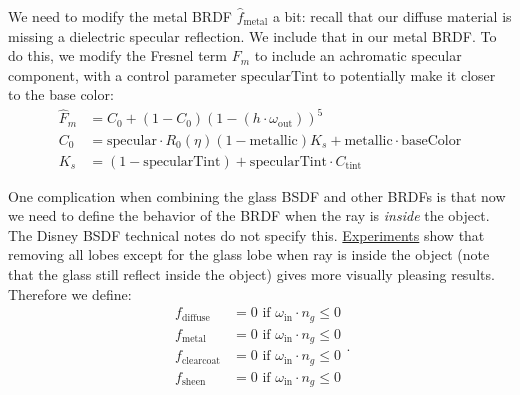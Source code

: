 We need to modify the metal BRDF $\hat{f}_{\text{metal}}$ a bit: recall that our diffuse material is missing
a dielectric specular reflection. We include that in our metal BRDF. To do this, we modify the Fresnel term $F_m$ to include an achromatic specular component, with a control parameter $\text{specularTint}$ to potentially make it closer to the base color:
\begin{equation}
\begin{aligned}
	\hat{F}_m &= C_0 + (1 - C_0) \left(1 - \left(h \cdot \omega_{\text{out}}\right)\right)^5 \\
	C_0 &= \text{specular} \cdot R_0(\eta) (1 - \text{metallic}) K_s + \text{metallic} \cdot \text{baseColor} \\
	K_s &= (1 - \text{specularTint}) + \text{specularTint} \cdot C_{\text{tint}}
\end{aligned}
\end{equation}

One complication when combining the glass BSDF and other BRDFs is that now we need to define the
behavior of the BRDF when the ray is \emph{inside} the object. The Disney BSDF technical notes do
not specify this. \href{https://github.com/mmp/pbrt-v3/issues/313}{Experiments} show that removing
all lobes except for the glass lobe when ray is inside the object (note that the glass still reflect
inside the object) gives more visually pleasing results. Therefore we define:
\begin{equation}
\begin{aligned}
	f_{\text{diffuse}} &= 0 \text{ if } \omega_{\text{in}} \cdot n_g \leq 0 \\
	f_{\text{metal}} &= 0 \text{ if } \omega_{\text{in}} \cdot n_g \leq 0 \\
	f_{\text{clearcoat}} &= 0 \text{ if } \omega_{\text{in}} \cdot n_g \leq 0 \\
	f_{\text{sheen}} &= 0 \text{ if } \omega_{\text{in}} \cdot n_g \leq 0
\end{aligned}.
\end{equation}


